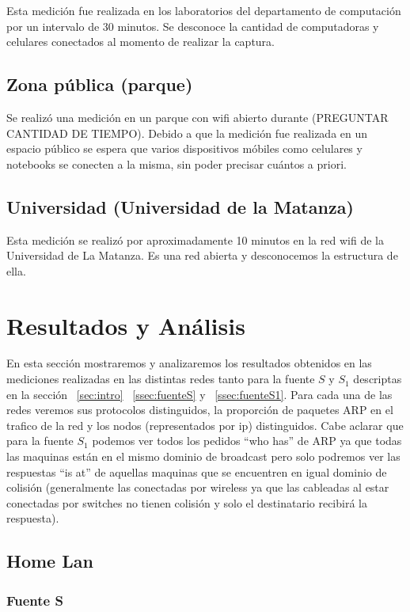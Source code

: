 \documentclass[final,inline,narroweqnarray,a4paper]{ieee}
\begin{document}
Esta medición fue realizada en los laboratorios del departamento de computación por un intervalo de 30 minutos. Se desconoce la cantidad de computadoras y celulares conectados al momento de realizar la captura.

\subsection{Zona pública (parque)}
Se realizó una medición en un parque con wifi abierto durante (PREGUNTAR CANTIDAD DE TIEMPO). Debido a que la medición fue realizada en un espacio público se espera que varios dispositivos móbiles como celulares y notebooks se conecten a la misma, sin poder precisar cuántos a priori.

\subsection{Universidad (Universidad de la Matanza)}
Esta medición se realizó por aproximadamente 10 minutos en la red wifi de la Universidad de La Matanza. Es una red abierta y desconocemos la estructura de ella.

\section{Resultados y Análisis}
En esta sección mostraremos y analizaremos los resultados obtenidos en las mediciones realizadas en las distintas redes tanto para la fuente $S$ y $S_1$ descriptas en la sección ~\ref{sec:intro} ~\ref{ssec:fuenteS} y ~\ref{ssec:fuenteS1}. Para cada una de las redes veremos sus protocolos distinguidos, la proporción de paquetes ARP en el trafico de la red y los nodos (representados por ip) distinguidos. Cabe aclarar que para la fuente $S_1$ podemos ver todos los pedidos ``who has'' de ARP ya que todas las maquinas están en el mismo dominio de broadcast pero solo podremos ver las respuestas ``is at'' de aquellas maquinas que se encuentren en igual dominio de colisión (generalmente las conectadas por wireless ya que las cableadas al estar conectadas por switches no tienen colisión y solo el destinatario recibirá la respuesta). 


\subsection{Home Lan}
\subsubsection{Fuente S}
\end{document}
